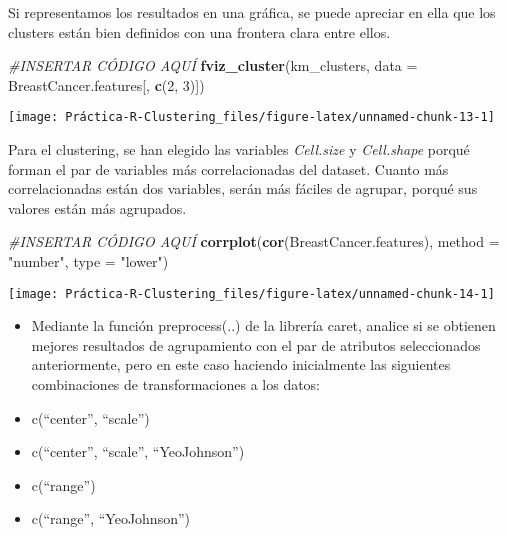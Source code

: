 \documentclass[
]{article}
\newenvironment{Shaded}{\begin{snugshade}}{\end{snugshade}}
\newcommand{\CommentTok}[1]{\textcolor[rgb]{0.56,0.35,0.01}{\textit{#1}}}
\newcommand{\DataTypeTok}[1]{\textcolor[rgb]{0.13,0.29,0.53}{#1}}
\newcommand{\DecValTok}[1]{\textcolor[rgb]{0.00,0.00,0.81}{#1}}
\newcommand{\KeywordTok}[1]{\textcolor[rgb]{0.13,0.29,0.53}{\textbf{#1}}}
\newcommand{\NormalTok}[1]{#1}
\newcommand{\StringTok}[1]{\textcolor[rgb]{0.31,0.60,0.02}{#1}}
\providecommand{\tightlist}{%
  \setlength{\itemsep}{0pt}\setlength{\parskip}{0pt}}
\begin{document}
Si representamos los resultados en una gráfica, se puede apreciar en
ella que los clusters están bien definidos con una frontera clara entre
ellos.

\begin{Shaded}
\begin{Highlighting}[]
\CommentTok{#INSERTAR CÓDIGO AQUÍ}
\KeywordTok{fviz_cluster}\NormalTok{(km_clusters, }\DataTypeTok{data =}\NormalTok{ BreastCancer.features[, }\KeywordTok{c}\NormalTok{(}\DecValTok{2}\NormalTok{, }\DecValTok{3}\NormalTok{)])}
\end{Highlighting}
\end{Shaded}

\begin{center}\texttt{[image: Práctica-R-Clustering\_files/figure-latex/unnamed-chunk-13-1]} \end{center}

Para el clustering, se han elegido las variables \emph{Cell.size} y
\emph{Cell.shape} porqué forman el par de variables más correlacionadas
del dataset. Cuanto más correlacionadas están dos variables, serán más
fáciles de agrupar, porqué sus valores están más agrupados.

\begin{Shaded}
\begin{Highlighting}[]
\CommentTok{#INSERTAR CÓDIGO AQUÍ}
\KeywordTok{corrplot}\NormalTok{(}\KeywordTok{cor}\NormalTok{(BreastCancer.features), }\DataTypeTok{method =} \StringTok{"number"}\NormalTok{, }\DataTypeTok{type =} \StringTok{"lower"}\NormalTok{)}
\end{Highlighting}
\end{Shaded}

\begin{center}\texttt{[image: Práctica-R-Clustering\_files/figure-latex/unnamed-chunk-14-1]} \end{center}

\begin{itemize}
\tightlist
\item
  Mediante la función preprocess(..) de la librería caret, analice si se
  obtienen mejores resultados de agrupamiento con el par de atributos
  seleccionados anteriormente, pero en este caso haciendo inicialmente
  las siguientes combinaciones de transformaciones a los datos:
\end{itemize}

\newpage

\begin{itemize}
\tightlist
\item
  c(``center'', ``scale'')
\item
  c(``center'', ``scale'', ``YeoJohnson'')
\item
  c(``range'')
\item
  c(``range'', ``YeoJohnson'')
\end{itemize}
\end{document}
